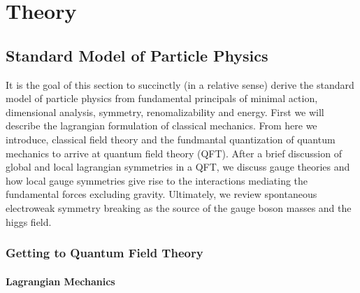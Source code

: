 \chapter{Theory}

\section{Standard Model of Particle Physics}

It is the goal of this section to succinctly (in a relative sense) derive the standard model of particle physics from 
fundamental principals of minimal action, dimensional analysis, symmetry, renomalizability and energy.
First we will describe the lagrangian formulation of classical mechanics. From here we introduce, 
classical field theory and the fundmantal quantization of quantum mechanics to arrive at quantum field
theory (QFT). After a brief discussion of global and local lagrangian symmetries in a QFT, we discuss
gauge theories and how local gauge symmetries give rise to the interactions mediating the 
fundamental forces excluding gravity. Ultimately, we review spontaneous 
electroweak symmetry breaking as the source of the gauge boson masses and the higgs field. 

\subsection{Getting to Quantum Field Theory}

\subsubsection{Lagrangian Mechanics}

